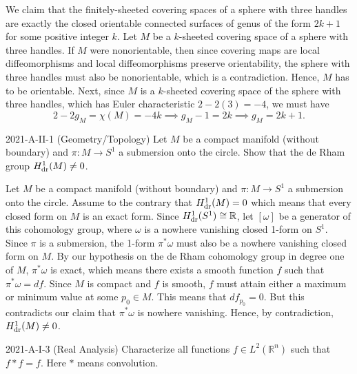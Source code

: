\documentclass{article}
\begin{document}
\begin{solutions}
	We claim that the finitely-sheeted covering spaces of a sphere with three handles are exactly the closed orientable connected surfaces of genus of the form $2k + 1$ for some positive integer $k$. Let $M$ be a $k$-sheeted covering space of a sphere with three handles. If $M$ were nonorientable, then since covering maps are local diffeomorphisms and local diffeomorphisms preserve orientability, the sphere with three handles must also be nonorientable, which is a contradiction. Hence, $M$ has to be orientable. Next, since $M$ is a $k$-sheeted covering space of the sphere with three handles, which has Euler characteristic $2 - 2(3) = -4$, we must have 
		\begin{equation}
			2 - 2g_{M} = \chi(M) = -4k \implies g_{M} -1 = 2k \implies g_{M} = 2k + 1. 
		\end{equation}
\end{solutions}
\begin{prb}{2021-A-II-1 (Geometry/Topology)}
	Let $M$ be a compact manifold (without boundary) and $\pi: M \to S^{1}$ a submersion onto the circle. Show that the de Rham group $H^{1}_{\text{dr}}(M) \neq 0$. 
\end{prb}
\begin{solutions}
	Let $M$ be a compact manifold (without boundary) and $\pi: M \to S^{1}$ a submersion onto the circle. Assume to the contrary that $H^{1}_{\text{dr}}(M) = 0$ which means that every closed form on $M$ is an exact form. Since $H^{1}_{\text{dr}}(S^{1}) \cong \mathbb{R}$, let $[\omega]$ be a generator of this cohomology group, where $\omega$ is a nowhere vanishing closed 1-form on $S^{1}$. Since $\pi$ is a submersion, the 1-form $\pi^{\ast}\omega$ must also be a nowhere vanishing closed form on $M$. By our hypothesis on the de Rham cohomology group in degree one of $M$, $\pi^{\ast}\omega$ is exact, which means there exists a smooth function $f$ such that $\pi^{\ast}\omega = df$. Since $M$ is compact and $f$ is smooth, $f$ must attain either a maximum or minimum value at some $p_{0} \in M$. This means that $df_{p_{0}} = 0$. But this contradicts our claim that $\pi^{\ast}\omega$ is nowhere vanishing. Hence, by contradiction, $H^{1}_{\text{dr}}(M) \neq 0$. 
\end{solutions}
\begin{prb}{2021-A-I-3 (Real Analysis)}
	Characterize all functions $f \in L^{2}(\mathbb{R}^{n})$ such that $f \ast f = f$. Here $\ast$ means convolution. 
\end{prb}
\end{document}
